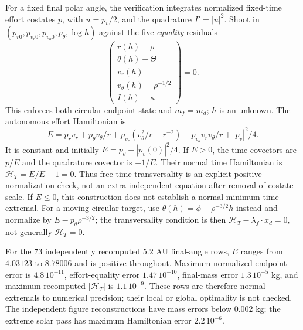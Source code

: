 \documentclass[journal,a4paper]{IEEEtran}
\begin{document}
For a fixed final polar angle, the verification integrates
normalized fixed-time effort costates $p$, with $u=p_v/2$, and the
quadrature $I'=|u|^2$. Shoot in
$(p_{r0},p_{v_r0},p_{v_\theta0},p_\theta,\log h)$ against the five
\emph{equality} residuals
\begin{equation}
 \begin{pmatrix}r(h)-\rho\\\theta(h)-\Theta\\v_r(h)\\
 v_\theta(h)-\rho^{-1/2}\\I(h)-\kappa\end{pmatrix}=0.
 \label{eq:corrected_residual}
\end{equation}
This enforces both circular endpoint state and $m_f=m_d$; $h$ is an
unknown.
The autonomous effort Hamiltonian is
\begin{equation}
 E=p_rv_r+p_\theta v_\theta/r
 +p_{v_r}(v_\theta^2/r-r^{-2})
 -p_{v_\theta}v_rv_\theta/r+|p_v|^2/4.
\end{equation}
It is constant and initially $E=p_\theta+|p_v(0)|^2/4$.
If $E>0$, the time covectors are $p/E$ and the quadrature covector
is $-1/E$. Their normal time Hamiltonian is $\mathcal H_T=E/E-1=0$.
Thus free-time transversality is an explicit positive-normalization
check, not an extra independent equation after removal of costate scale.
If $E\le0$, this construction does not establish a normal minimum-time
extremal. For a moving circular target, use
$\theta(h)=\phi+\rho^{-3/2}h$ instead and normalize by
$E-p_\theta\rho^{-3/2}$; the transversality condition is then
$\mathcal H_T-\lambda_f\cdot\dot x_d=0$, not generally $\mathcal H_T=0$.

For the 73 independently recomputed $5.2$ AU final-angle rows,
$E$ ranges from $4.03123$ to $8.78006$ and is positive throughout.
Maximum normalized endpoint error is $4.8\,10^{-11}$, effort-equality
error $1.47\,10^{-10}$, final-mass error $1.3\,10^{-5}$ kg, and
maximum recomputed $|\mathcal H_T|$ is $1.1\,10^{-9}$.
These rows are therefore normal extremals to numerical precision;
their local or global optimality is not checked.
The independent figure reconstructions have mass errors below $0.002$ kg;
the extreme solar pass has maximum Hamiltonian error $2.2\,10^{-6}$.
\end{document}
